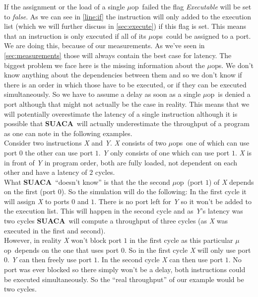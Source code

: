 \documentclass[a4paper,12pt,titlepage, twoside]{report}
\newcommand{\suaca}{\textbf{SUACA}}
\newcommand{\microop}{$\mu$op}
\newcommand{\microops}{$\mu$ops}
\begin{document}
If the assignment or the load of a single \microop\ failed the flag \emph{Executable} will be set to \emph{false}. As we can see in \autoref{line:if} the instruction will only added to the execution list (which we will further discuss in \autoref{sec:execute}) if this flag is set. This means that an instruction is only executed if all of its \microops\ could be assigned to a port. We are doing this, because of our measurements. As we've seen in \autoref{sec:measurements} those will always contain the best case for latency. The biggest problem we face here is the missing information about the \microops. We don't know anything about the dependencies between them and so we don't know if there is an order in which those have to be executed, or if they can be executed simultaneously. So we have to assume a delay as soon as a single \microop\ is denied a port although that might not actually be the case in reality. This means that we will potentially overestimate the latency of a single instruction although it is possible that \suaca\ will actually underestimate the throughput of a program as one can note in the following examples.\\


Consider two instructions \emph{X} and \emph{Y}. \emph{X} consists of two \microops\ one of which can use port $0$ the other can use port $1$. \emph{Y} only consists of one which can use port $1$. \emph{X} is in front of \emph{Y} in program order, both are fully loaded, not dependent on each other and have a latency of $2$ cycles.\\
What \suaca\ ``doesn't know'' is that the the second \microop\ (port $1$) of \emph{X} depends on the first (port $0$). So the simulation will do the following: In the first cycle it will assign \emph{X} to ports $0$ and $1$. There is no port left for \emph{Y} so it won't be added to the execution list. This will happen in the second cycle and as \emph{Y}'s latency was two cycles \suaca\ will compute a throughput of three cycles (as \emph{X} was executed in the first and second).\\
However, in reality \emph{X} won't block port $1$ in the first cycle as this particular \microop\ depends on the one that uses port $0$. So in the first cycle \emph{X} will only use port $0$. \emph{Y} can then freely use port $1$. In the second cycle \emph{X} can then use port $1$. No port was ever blocked so there simply won't be a delay, both instructions could be executed simultaneously. So the ``real throughput'' of our example would be two cycles.\\
\end{document}
